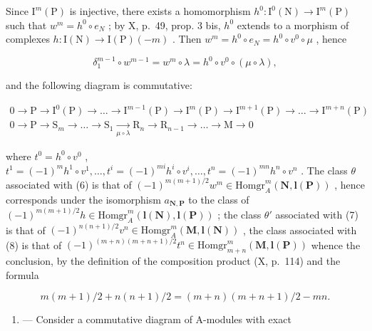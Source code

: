 Since \(\mathrm{I}^{m}(\mathrm{P})\) is injective, there exists a homomorphism \(h^{0}: \mathrm{I}^{0}(\mathrm{N}) \to \mathrm{I}^{m}(\mathrm{P})\) such that \(w^{m} = h^{0} \circ e_{N}\) ; by X, p.~49, prop. 3 bis, \(h^{0}\) extends to a morphism of complexes \(h: \mathrm{I}(\mathrm{N}) \to \mathrm{I}(\mathrm{P})(-m)\) . Then \(w^{m} = h^{0} \circ e_{N} = h^{0} \circ v^{0} \circ \mu\) , hence

\[
\delta_ {1} ^ {m - 1} \circ w ^ {m - 1} = w ^ {m} \circ \lambda = h ^ {0} \circ v ^ {0} \circ (\mu \circ \lambda),
\]

and the following diagram is commutative:

\[
\begin{array}{l}0 \longrightarrow \mathrm{P} \longrightarrow \mathrm{I} ^ {0} (\mathrm{P}) \longrightarrow \dots \longrightarrow \mathrm{I} ^ {m - 1} (\mathrm{P}) \longrightarrow \mathrm{I} ^ {m} (\mathrm{P}) \longrightarrow \mathrm{I} ^ {m + 1} (\mathrm{P}) \longrightarrow \dots \longrightarrow \mathrm{I} ^ {m + n} (\mathrm{P})\\0 \longrightarrow \mathrm{P} \longrightarrow \mathrm{S} _ {m} \longrightarrow \dots \longrightarrow \mathrm{S} _ {1} \underset {\mu \circ \lambda} {\longrightarrow} \mathrm{R} _ {n} \longrightarrow \mathrm{R} _ {n - 1} \longrightarrow \dots \longrightarrow \mathrm{M} \rightarrow 0\end{array}
\]

where \(t^0 = h^0 \circ v^0\) , \(t^1 = (-1)^m h^1 \circ v^1, \ldots, t^i = (-1)^{mi} h^i \circ v^i, \ldots, t^n = (-1)^{mn} h^n \circ v^n\) . The class \(\theta\) associated with (6) is that of \((-1)^{m(m+1)/2} w^m \in \text{Homgr}_A^m(\mathbf{N}, \mathbf{l}(\mathbf{P}))\) , hence corresponds under the isomorphism \(a_{\mathbf{N},\mathbf{P}}\) to the class of \((-1)^{m(m+1)/2} h \in \text{Homgr}_A^m(\mathbf{l}(\mathbf{N}), \mathbf{l}(\mathbf{P}))\) ; the class \(\theta'\) associated with (7) is that of \((-1)^{n(n+1)/2} v^n \in \text{Homgr}_A^m(\mathbf{M}, \mathbf{l}(\mathbf{N}))\) , the class associated with (8) is that of \((-1)^{(m+n)(m+n+1)/2} t^n \in \text{Homgr}_{m+n}^m(\mathbf{M}, \mathbf{l}(\mathbf{P}))\) whence the conclusion, by the definition of the composition product (X, p.~114) and the formula

\[
m (m + 1) / 2 + n (n + 1) / 2 = (m + n) (m + n + 1) / 2 - m n.
\]

\begin{enumerate}
\def\labelenumi{\arabic{enumi}.}
\setcounter{enumi}{3}
\tightlist
\item
  --- Consider a commutative diagram of A-modules with exact
\end{enumerate}

